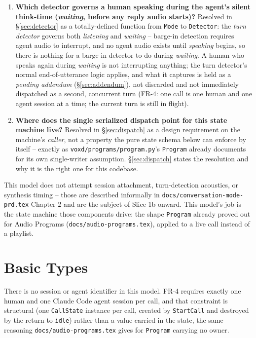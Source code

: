 \documentclass[a4paper,10pt,fleqn]{article}
\begin{document}
\begin{enumerate}
  \item \textbf{Which detector governs a human speaking during the agent's
    silent think-time (\emph{waiting}, before any reply audio starts)?}
    Resolved in \S\ref{sec:detector} as a totally-defined function from
    \texttt{Mode} to \texttt{Detector}: the \emph{turn detector} governs
    both \emph{listening} and \emph{waiting} -- barge-in detection requires
    agent audio to interrupt, and no agent audio exists until \emph{speaking}
    begins, so there is nothing for a barge-in detector to do during
    \emph{waiting}. A human who speaks again during \emph{waiting} is not
    interrupting anything; the turn detector's normal end-of-utterance logic
    applies, and what it captures is held as a \emph{pending addendum}
    (\S\ref{sec:addendum}), not discarded and not immediately dispatched as a
    second, concurrent turn (FR-4: one call is one human and one agent
    session at a time; the current turn is still in flight).
  \item \textbf{Where does the single serialized dispatch point for this
    state machine live?} Resolved in \S\ref{sec:dispatch} as a design
    requirement on the machine's \emph{caller}, not a property the pure
    state schema below can enforce by itself -- exactly as
    \texttt{voxd/programs/program.py}'s \texttt{Program} already documents
    for its own single-writer assumption. \S\ref{sec:dispatch} states the
    resolution and why it is the right one for this codebase.
\end{enumerate}

This model does not attempt session attachment, turn-detection acoustics, or
synthesis timing -- those are described informally in
\texttt{docs/conversation-mode-prd.tex} Chapter 2 and are the subject of
Slice 1b onward. This model's job is the state machine those components
drive: the shape \texttt{Program} already proved out for Audio Programs
(\texttt{docs/audio-programs.tex}), applied to a live call instead of a
playlist.

\section{Basic Types}

There is no session or agent identifier in this model. FR-4 requires
exactly one human and one Claude Code agent session per call, and that
constraint is structural (one \texttt{CallState} instance per call, created
by \texttt{StartCall} and destroyed by the return to \texttt{idle}) rather
than a value carried in the state, the same reasoning
\texttt{docs/audio-programs.tex} gives for \texttt{Program} carrying no
owner.
\end{document}
